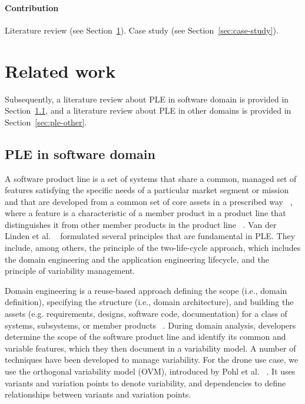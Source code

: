 \documentclass[sigconf,review]{acmart}
\begin{document}
\paragraph{Contribution}

Literature review (see Section~\ref{sec:related-work}). Case study (see Section~\ref{sec:case-study}).

\section{Related work}
\label{sec:related-work}

Subsequently, a literature review about PLE in software domain is provided in Section~\ref{sec:ple-software},
and a literature review about PLE in other domains is provided in Section~\ref{sec:ple-other}.

\subsection{PLE in software domain}
\label{sec:ple-software}

A software product line is a set of systems that share a common, managed set of features satisfying the specific needs of a particular market segment or mission and that are developed from a common set of core assets in a prescribed way ~\cite{Clements_2002}, where
a feature is a characteristic of a member product in a product line that distinguishes it from other member products in the product line ~\cite{ISO/IEC_26550}.
Van der Linden et al. ~\cite{Linden_2007} formulated several principles that are fundamental in PLE. They include, among others, the principle of the two-life-cycle approach, which includes the domain engineering and the application engineering lifecycle, and the principle of variability management.

Domain engineering is a reuse-based approach defining the scope (i.e., domain definition), specifying the structure (i.e., domain architecture), and building the assets (e.g. requirements, designs, software code, documentation) for a class of systems, subsystems, or member products ~\cite{ISO/IEC_26550}. During domain analysis, developers determine the scope of the software product line and identify its common and variable features, which they then document in a variability model. 
A number of techniques have been developed to manage variability.
For the drone use case, we use the orthogonal variability model (OVM), introduced by Pohl et al. ~\cite{Pohl_2005}. It uses variants and variation points to denote variability, and dependencies to define relationships between variants and variation points.
\end{document}
